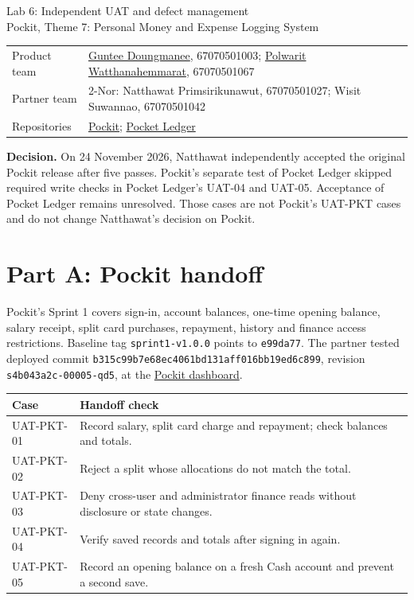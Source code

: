 \documentclass[11pt,a4paper]{article}
\begin{document}
\begin{center}
{\LARGE Lab 6: Independent UAT and defect management}\\[6pt]
{\large Pockit, Theme 7: Personal Money and Expense Logging System}
\end{center}
\begin{tabularx}{\linewidth}{lX}
Product team & \href{https://github.com/ovenmakemeheat}{Guntee Doungmanee}, 67070501003; \href{https://github.com/MadMax168}{Polwarit Watthanahemmarat}, 67070501067 \\
Partner team & 2-Nor: Natthawat Primsirikunawut, 67070501027; Wisit Suwannao, 67070501042 \\
Repositories & \href{https://github.com/CPE334-Pockit/Pockit}{Pockit}; \href{https://github.com/Palapluem/pocket-ledger}{Pocket Ledger} \\
\end{tabularx}

\textbf{Decision.} On 24 November 2026, Natthawat independently accepted the original Pockit release after five passes. Pockit's separate test of Pocket Ledger skipped required write checks in Pocket Ledger's UAT-04 and UAT-05. Acceptance of Pocket Ledger remains unresolved. Those cases are not Pockit's UAT-PKT cases and do not change Natthawat's decision on Pockit.
\tableofcontents

\section{Part A: Pockit handoff}
Pockit's Sprint 1 covers sign-in, account balances, one-time opening balance, salary receipt, split card purchases, repayment, history and finance access restrictions. Baseline tag \texttt{sprint1-v1.0.0} points to \texttt{e99da77}. The partner tested deployed commit \texttt{b315c99b7e68ec4061bd131aff016bb19ed6c899}, revision \texttt{s4b043a2c-00005-qd5}, at the \href{https://s4b043a2c-4d7hbszvwq-as.a.run.app/dashboard}{Pockit dashboard}.

\begin{tabularx}{\linewidth}{lX}
Case & Handoff check \\\hline
UAT-PKT-01 & Record salary, split card charge and repayment; check balances and totals. \\
UAT-PKT-02 & Reject a split whose allocations do not match the total. \\
UAT-PKT-03 & Deny cross-user and administrator finance reads without disclosure or state changes. \\
UAT-PKT-04 & Verify saved records and totals after signing in again. \\
UAT-PKT-05 & Record an opening balance on a fresh Cash account and prevent a second save. \\
\end{tabularx}
\end{document}
